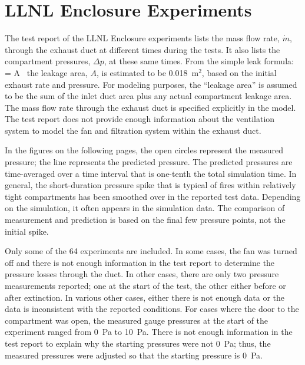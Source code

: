 \clearpage

\section{LLNL Enclosure Experiments}

The test report of the LLNL Enclosure experiments lists the mass flow rate, $\dot{m}$, through the exhaust duct at different times during the tests. It also lists the compartment pressures, $\Delta p$, at these same times. From the simple leak formula:
\be
    = A \, 
\ee
the leakage area, $A$, is estimated to be 0.018~m$^2$, based on the initial exhaust rate and pressure. For modeling purposes, the ``leakage area'' is assumed to be the sum of the inlet duct area plus any actual compartment leakage area. The mass flow rate through the exhaust duct is specified explicitly in the model. The test report does not provide enough information about the ventilation system to model the fan and filtration system within the exhaust duct.

In the figures on the following pages, the open circles represent the measured pressure; the line represents the predicted pressure. The predicted pressures are time-averaged over a time interval that is one-tenth the total simulation time. In general, the short-duration pressure spike that is typical of fires within relatively tight compartments has been smoothed over in the reported test data. Depending on the simulation, it often appears in the simulation data. The comparison of measurement and prediction is based on the final few pressure points, not the initial spike.

Only some of the 64 experiments are included. In some cases, the fan was turned off and there is not enough information in the test report to determine the pressure losses through the duct. In other cases, there are only two pressure measurements reported; one at the start of the test, the other either before or after extinction. In various other cases, either there is not enough data or the data is inconsistent with the reported conditions. For cases where the door to the compartment was open, the measured gauge pressures at the start of the experiment ranged from 0~Pa to 10~Pa. There is not enough information in the test report to explain why the starting pressures were not 0~Pa; thus, the measured pressures were adjusted so that the starting pressure is 0~Pa.

